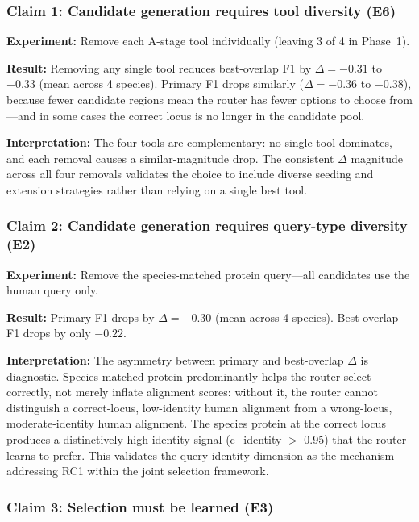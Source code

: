 

\subsubsection{Claim 1: Candidate generation requires tool diversity (E6)}

\textbf{Experiment:} Remove each A-stage tool individually (leaving 3 of 4 in Phase~1).

\textbf{Result:} Removing any single tool reduces best-overlap F1 by $\Delta = -0.31$ to $-0.33$ (mean across 4 species). Primary F1 drops similarly ($\Delta = -0.36$ to $-0.38$), because fewer candidate regions mean the router has fewer options to choose from---and in some cases the correct locus is no longer in the candidate pool.

\textbf{Interpretation:} The four tools are complementary: no single tool dominates, and each removal causes a similar-magnitude drop. The consistent $\Delta$ magnitude across all four removals validates the choice to include diverse seeding and extension strategies rather than relying on a single best tool.

\subsubsection{Claim 2: Candidate generation requires query-type diversity (E2)}

\textbf{Experiment:} Remove the species-matched protein query---all candidates use the human query only.

\textbf{Result:} Primary F1 drops by $\Delta = -0.30$ (mean across 4 species). Best-overlap F1 drops by only $-0.22$.

\textbf{Interpretation:} The asymmetry between primary and best-overlap $\Delta$ is diagnostic. Species-matched protein predominantly helps the router select correctly, not merely inflate alignment scores: without it, the router cannot distinguish a correct-locus, low-identity human alignment from a wrong-locus, moderate-identity human alignment. The species protein at the correct locus produces a distinctively high-identity signal (c\_identity $>$ 0.95) that the router learns to prefer. This validates the query-identity dimension as the mechanism addressing RC1 within the joint selection framework.

\subsubsection{Claim 3: Selection must be learned (E3)}

